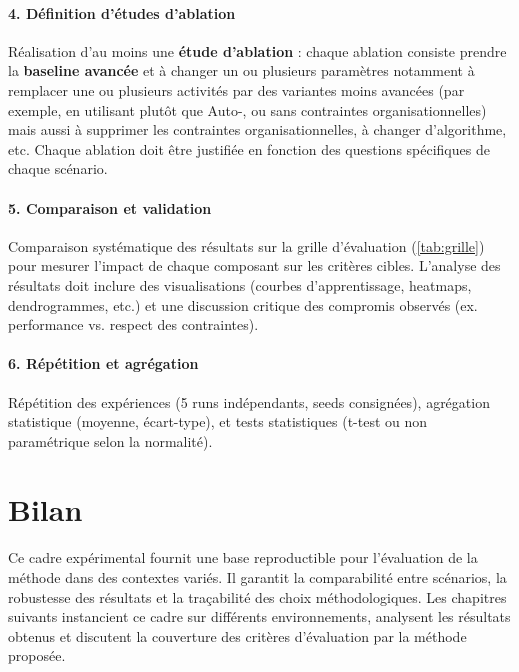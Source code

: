 \paragraph{4. Définition d’études d’ablation}
Réalisation d’au moins une \textbf{étude d’ablation} : chaque ablation consiste prendre la \textbf{baseline avancée} et à changer un ou plusieurs paramètres notamment à remplacer une ou plusieurs activités  par des variantes moins avancées (par exemple, \texttt{} en utilisant  plutôt que Auto-, ou \texttt{} sans contraintes organisationnelles) mais aussi à supprimer les contraintes organisationnelles, à changer d’algorithme, etc. Chaque ablation doit être justifiée en fonction des questions spécifiques de chaque scénario.

\paragraph{5. Comparaison et validation}
Comparaison systématique des résultats sur la grille d’évaluation (\autoref{tab:grille}) pour mesurer l’impact de chaque composant sur les critères cibles. L'analyse des résultats doit inclure des visualisations (courbes d’apprentissage, heatmaps, dendrogrammes, etc.) et une discussion critique des compromis observés (ex. performance vs. respect des contraintes).

\paragraph{6. Répétition et agrégation}
Répétition des expériences (5 runs indépendants, seeds consignées), agrégation statistique (moyenne, écart-type), et tests statistiques (t-test ou non paramétrique selon la normalité).


\section{Bilan}

Ce cadre expérimental fournit une base reproductible pour l’évaluation de la méthode  dans des contextes variés. Il garantit la comparabilité entre scénarios, la robustesse des résultats et la traçabilité des choix méthodologiques. Les chapitres suivants instancient ce cadre sur différents environnements, analysent les résultats obtenus et discutent la couverture des critères d’évaluation par la méthode proposée.


\clearpage
\thispagestyle{empty}
\null
\newpage


